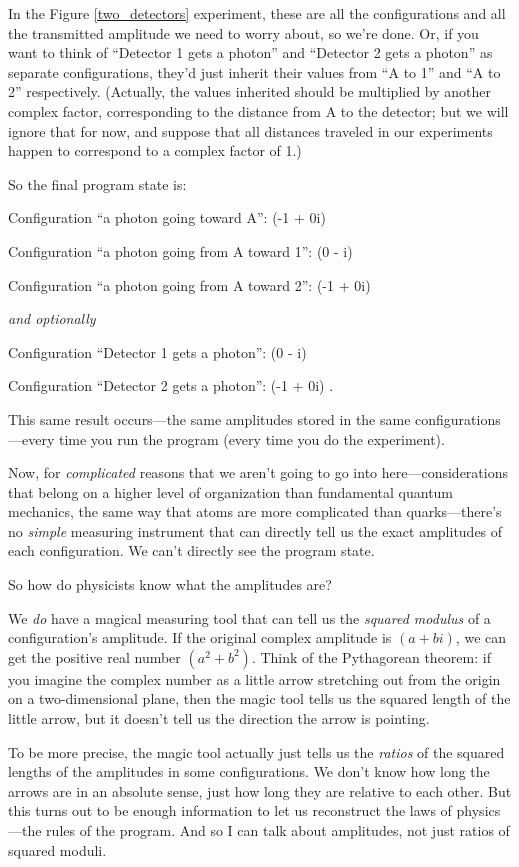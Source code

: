 {
 In the Figure \ref{two_detectors} experiment, these are all the configurations
and all the transmitted amplitude we need to worry about, so
we're done. Or, if you want to think of
``Detector 1 gets a photon'' and
``Detector 2 gets a photon'' as
separate configurations, they'd just inherit their
values from ``A to 1'' and
``A to 2'' respectively. (Actually,
the values inherited should be multiplied by another complex factor,
corresponding to the distance from A to the detector; but we will
ignore that for now, and suppose that all distances traveled in our
experiments happen to correspond to a complex factor of 1.)}

{
 So the final program state is:}

{
 Configuration ``a photon going toward
A'': (-1 + 0i)}

{
 Configuration ``a photon going from A toward
1'': (0 - i)}

{
 Configuration ``a photon going from A toward
2'': (-1 + 0i)}

{
 \textit{and optionally}}

{
 Configuration ``Detector 1 gets a
photon'': (0 - i)}

{
 Configuration ``Detector 2 gets a
photon'': (-1 + 0i) .}

{
 This same result occurs---the same amplitudes stored in the same
configurations---every time you run the program (every time you do the
experiment).}

{
 Now, for \textit{complicated} reasons that we
aren't going to go into here---considerations that
belong on a higher level of organization than fundamental quantum
mechanics, the same way that atoms are more complicated than
quarks---there's no \textit{simple} measuring
instrument that can directly tell us the exact amplitudes of each
configuration. We can't directly see the program
state.}

{
 So how do physicists know what the amplitudes are?}

{
 We \textit{do} have a magical measuring tool that can tell us the
\textit{squared modulus} of a configuration's
amplitude. If the original complex amplitude is $(a + bi)$, we can get
the positive real number $(a^{2} + b^{2})$.
Think of the Pythagorean theorem: if you imagine the complex number as
a little arrow stretching out from the origin on a two-dimensional
plane, then the magic tool tells us the squared length of the little
arrow, but it doesn't tell us the direction the arrow
is pointing.}

{
 To be more precise, the magic tool actually just tells us the
\textit{ratios} of the squared lengths of the amplitudes in some
configurations. We don't know how long the arrows are
in an absolute sense, just how long they are relative to each other.
But this turns out to be enough information to let us reconstruct the
laws of physics---the rules of the program. And so I can talk about
amplitudes, not just ratios of squared moduli.}

